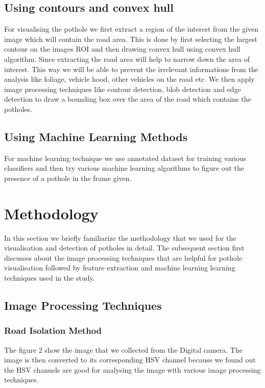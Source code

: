 \documentclass[journal]{IEEEtran}
\begin{document}
\subsection{Using contours and convex hull}

For visualising the pothole we first extract a region of the interest from the given image which will contain the road area. This is done by first selecting the largest contour on the images ROI and then drawing convex hull using convex hull algorithm. Since extracting the road area will help to narrow down the area of interest. This way we will be able to prevent the irrelevant informations from the analysis like foliage, vehicle hood, other vehicles on the road etc. We then apply image processing techniques like contour detection, blob detection and edge detection to draw a bounding box over the area of the road which contains the potholes.

\subsection{Using Machine Learning Methods}
For machine learning technique we use annotated dataset \cite{dataset} for training various classifiers and then try various machine learning algorithms to figure out the presence of a pothole in the frame given.

\section{Methodology}

In this section we briefly familiarize the methodology that we used for the visualisation and detection of potholes in detail. The subsequent section first discusses about the image processing techniques that are helpful for pothole visualisation followed by feature extraction and machine learning learning techniques  used in the study.

\subsection{Image Processing Techniques}

\subsubsection{Road Isolation Method}

The figure 2 show the image that we collected from the Digital camera. The image is then converted to its corresponding HSV channel because we found out the HSV channels are good for analysing the image with various image processing techniques. 
\end{document}
